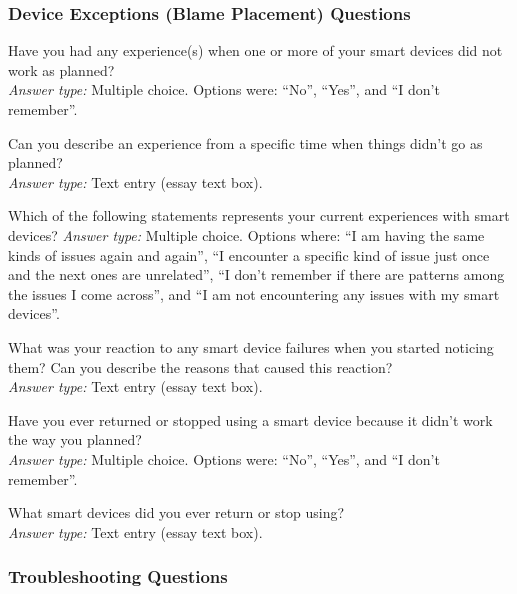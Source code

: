 \subsubsection{Device Exceptions (Blame Placement) Questions}
\label{appdx:survey:exceptions}

 Have you had any experience(s) when one or more of your smart devices did not work as planned? \\
\textit{Answer type:} Multiple choice. Options were: ``No'', ``Yes'', and ``I don't remember''.

 Can you describe an experience from a specific time when things didn't go as planned? \\
\textit{Answer type:} Text entry (essay text box).

 Which of the following statements represents your current experiences with smart devices?
\textit{Answer type:} Multiple choice. Options where: ``I am having the same kinds of issues again and again'', ``I encounter a specific kind of issue just once and the next ones are unrelated'', ``I don't remember if there are patterns among the issues I come across'', and ``I am not encountering any issues with my smart devices''.

 What was your reaction to any smart device failures when you started noticing them? Can you describe the reasons that caused this reaction? \\
\textit{Answer type:} Text entry (essay text box).

 Have you ever returned or stopped using a smart device because it didn't work the way you planned? \\
\textit{Answer type:} Multiple choice. Options were: ``No'', ``Yes'', and ``I don't remember''.

 What smart devices did you ever return or stop using? \\
\textit{Answer type:} Text entry (essay text box).

\subsubsection{Troubleshooting Questions}
\label{appdx:survey:tb}

